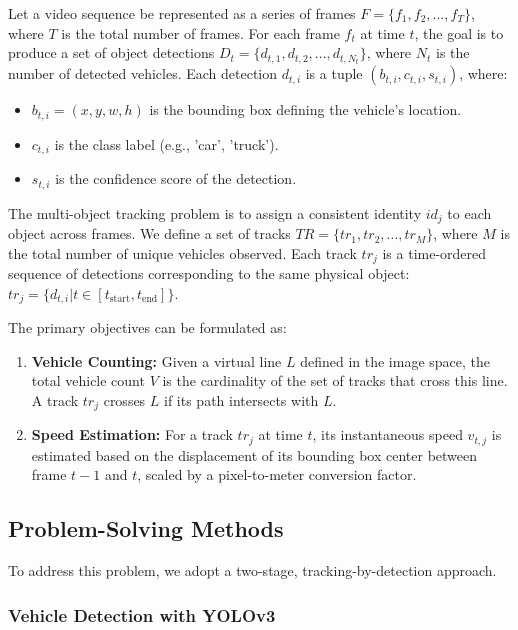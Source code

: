\documentclass{article}
\begin{document}
Let a video sequence be represented as a series of frames $F = \{f_1, f_2, ..., f_T\}$, where $T$ is the total number of frames. For each frame $f_t$ at time $t$, the goal is to produce a set of object detections $D_t = \{d_{t,1}, d_{t,2}, ..., d_{t,N_t}\}$, where $N_t$ is the number of detected vehicles. Each detection $d_{t,i}$ is a tuple $(b_{t,i}, c_{t,i}, s_{t,i})$, where:
\begin{itemize}
    \item $b_{t,i} = (x, y, w, h)$ is the bounding box defining the vehicle's location.
    \item $c_{t,i}$ is the class label (e.g., 'car', 'truck').
    \item $s_{t,i}$ is the confidence score of the detection.
\end{itemize}

The multi-object tracking problem is to assign a consistent identity $id_j$ to each object across frames. We define a set of tracks $TR = \{tr_1, tr_2, ..., tr_M\}$, where $M$ is the total number of unique vehicles observed. Each track $tr_j$ is a time-ordered sequence of detections corresponding to the same physical object: $tr_j = \{d_{t,i} | t \in [t_{\text{start}}, t_{\text{end}}]\}$.

The primary objectives can be formulated as:
\begin{enumerate}
    \item \textbf{Vehicle Counting:} Given a virtual line $L$ defined in the image space, the total vehicle count $V$ is the cardinality of the set of tracks that cross this line. A track $tr_j$ crosses $L$ if its path intersects with $L$.
    \item \textbf{Speed Estimation:} For a track $tr_j$ at time $t$, its instantaneous speed $v_{t,j}$ is estimated based on the displacement of its bounding box center between frame $t-1$ and $t$, scaled by a pixel-to-meter conversion factor.
\end{enumerate}

\subsection{Problem-Solving Methods}

To address this problem, we adopt a two-stage, tracking-by-detection approach.

\subsubsection{Vehicle Detection with YOLOv3}
\end{document}

